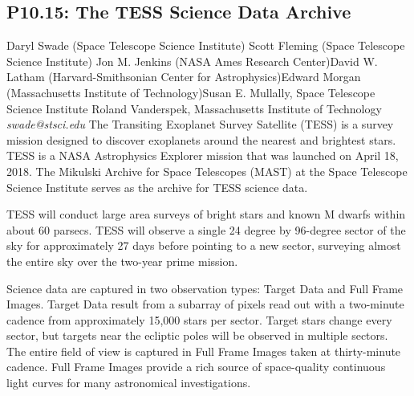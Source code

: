 \documentclass{report}
\begin{document}
\subsection*{P10.15: The TESS Science Data Archive}
\bigskip
Daryl Swade (Space Telescope Science Institute) \newline Scott Fleming (Space Telescope Science Institute) \newline  Jon M. Jenkins (NASA Ames Research Center)\newline  David W. Latham (Harvard-Smithsonian Center for Astrophysics)\newline Edward Morgan (Massachusetts Institute of Technology)\newline  Susan E. Mullally, Space Telescope Science Institute
Roland Vanderspek, Massachusetts Institute of Technology\newline\newline
{\it swade@stsci.edu}\newline
\newline\newline
The Transiting Exoplanet Survey Satellite (TESS) is a survey mission designed to discover exoplanets around the nearest and brightest stars.  TESS is a NASA Astrophysics Explorer mission that was launched on April 18, 2018.  The Mikulski Archive for Space Telescopes (MAST) at the Space Telescope Science Institute serves as the archive for TESS science data.

TESS will conduct large area surveys of bright stars and known M dwarfs within about 60 parsecs.  TESS will observe a single 24 degree by 96-degree sector of the sky for approximately 27 days before pointing to a new sector, surveying almost the entire sky over the two-year prime mission.

Science data are captured in two observation types: Target Data and Full Frame Images.  Target Data result from a subarray of pixels read out with a two-minute cadence from approximately 15,000 stars per sector.  Target stars change every sector, but targets near the ecliptic poles will be observed in multiple sectors.  The entire field of view is captured in Full Frame Images taken at thirty-minute cadence.  Full Frame Images provide a rich source of space-quality continuous light curves for many astronomical investigations.
\end{document}

